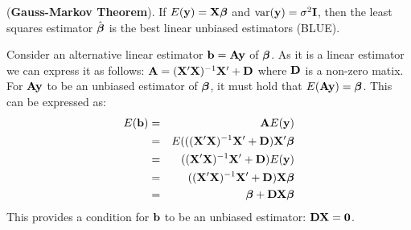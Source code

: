 %
%
%
%
%
%
%
%


\btheo
({\bf Gauss-Markov Theorem}). If $E(\mathbf{y}) = \mathbf{X} \mbox{\boldmath $\beta$}$ and $\mathrm{var}(\mathbf{y}) = \sigma^2 {\bf I}$, then the least squares estimator $\hat{\mbox{\boldmath $\beta$}}$ is the best linear unbiased estimators (BLUE).
\estheo

Consider an alternative linear estimator $\mathbf{b} = \mathbf{A} \mathbf{y}$ of $\mbox{\boldmath $\beta$}$. As it is a linear estimator we can express it as follows: $\mathbf{A} = (\mathbf{X}' \mathbf{X})^{-1} \mathbf{X}' + \mathbf{D}$ where $\mathbf{D}$ is a non-zero matix.
For $\mathbf{A} \mathbf{y}$ to be an unbiased estimator
of $\mbox{\boldmath $\beta$}$, it must hold that $E(\mathbf{A} \mathbf{y}) = \mbox{\boldmath $\beta$}$. This can be expressed as:
\begin{eqnarray*}
E(\mathbf{b}) &=& \mathbf{A} E( \mathbf{y})\\
&=& E(((\mathbf{X}' \mathbf{X})^{-1} \mathbf{X}' + \mathbf{D}) \mathbf{X}' \mbox{\boldmath $\beta$} \\
&=& ((\mathbf{X}' \mathbf{X})^{-1} \mathbf{X}' + \mathbf{D})E(\mathbf{y})\\
&=& ((\mathbf{X}' \mathbf{X})^{-1} \mathbf{X}' + \mathbf{D})\mathbf{X} \mbox{\boldmath $\beta$}\\
&=& \mbox{\boldmath $\beta$} + \mathbf{D}\mathbf{X} \mbox{\boldmath $\beta$}
\end{eqnarray*}
This provides a condition for $\mathbf{b}$ to be an unbiased estimator: $\mathbf{D} \mathbf{X} = \bf 0$.


